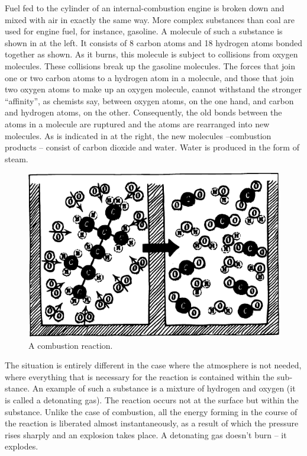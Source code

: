 Fuel fed to the cylinder of an internal-combustion en­gine is broken down and mixed with air in exactly the same way. More complex substances than coal are used for engine fuel, for instance, gasoline. A molecule of such a substance is shown in  at the left. It consists of 8 carbon atoms and 18 hydrogen atoms bonded together as shown. As it burns, this molecule is subject to colli­sions from oxygen molecules. These collisions break up the gasoline molecules. The forces that join one or two carbon atoms to a hydrogen atom in a molecule, and those that join two oxygen atoms to make up an oxygen mole­cule, cannot withstand the stronger ``affinity'', as chemists say, between oxygen atoms, on the one hand, and carbon and hydrogen atoms, on the other. Consequently, the old bonds between the atoms in a molecule are ruptured and the atoms are rearranged into new molecules. As is indi­cated in  at the right, the new molecules --com­bustion products -- consist of carbon dioxide and water. Water is produced in the form of steam.
\begin{figure}[!ht]
\centering
\includegraphics[width=\textwidth]{figures/fig-07-02.pdf}
\caption{A combustion reaction.}
\label{fig-7.2}
\end{figure}

The situation is entirely different in the case where the atmosphere is not needed, where everything that is necessary for the reaction is contained within the sub­ stance. An example of such a substance is a mixture of hydrogen and oxygen (it is called a detonating gas). The reaction occurs not at the surface but within the substance. Unlike the case of combustion, all the energy forming in the course of the reaction is liberated almost instanta­neously, as a result of which the pressure rises sharply and an explosion takes place. A detonating gas doesn’t burn -- it explodes.

